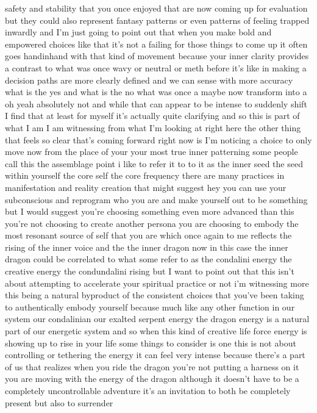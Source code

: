 \documentclass{article}
\begin{document}
safety and stability that you once enjoyed that are now coming up for
evaluation but they could also represent fantasy patterns or even
patterns of feeling trapped inwardly and I'm just going to point out
that when you make bold and empowered choices like that it's not a
failing for those things to come up it often goes handinhand with that
kind of movement because your inner clarity provides a contrast to what
was once wavy or neutral or meth before it's like in making a decision
paths are more clearly defined and we can sense with more accuracy what
is the yes and what is the no what was once a maybe now transform into a
oh yeah absolutely not and while that can appear to be intense to
suddenly shift I find that at least for myself it's actually quite
clarifying and so this is part of what I am I am witnessing from what
I'm looking at right here the other thing that feels so clear that's
coming forward right now is I'm noticing a choice to only move now from
the place of your your most true inner patterning some people call this
the assemblage point i like to refer it to to it as the inner seed the
seed within yourself the core self the core frequency there are many
practices in manifestation and reality creation that might suggest hey
you can use your subconscious and reprogram who you are and make
yourself out to be something but I would suggest you're choosing
something even more advanced than this you're not choosing to create
another persona you are choosing to embody the most resonant source of
self that you are which once again to me reflects the rising of the
inner voice and the the inner dragon now in this case the inner dragon
could be correlated to what some refer to as the condalini energy the
creative energy the condundalini rising but I want to point out that
this isn't about attempting to accelerate your spiritual practice or not
i'm witnessing more this being a natural byproduct of the consistent
choices that you've been taking to authentically embody yourself because
much like any other function in our system our condalinian our exalted
serpent energy the dragon energy is a natural part of our energetic
system and so when this kind of creative life force energy is showing up
to rise in your life some things to consider is one this is not about
controlling or tethering the energy it can feel very intense because
there's a part of us that realizes when you ride the dragon you're not
putting a harness on it you are moving with the energy of the dragon
although it doesn't have to be a completely uncontrollable adventure
it's an invitation to both be completely present but also to surrender
\end{document}
